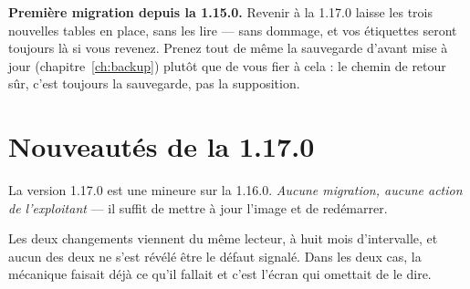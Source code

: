 \begin{warning}
\textbf{Première migration depuis la 1.15.0.} Revenir à la 1.17.0 laisse
les trois nouvelles tables en place, sans les lire \string— sans
dommage, et vos étiquettes seront toujours là si vous revenez. Prenez
tout de même la sauvegarde d'avant mise à jour
(chapitre~\ref{ch:backup}) plutôt que de vous fier à cela : le chemin de
retour sûr, c'est toujours la sauvegarde, pas la supposition.
\end{warning}

\section{Nouveautés de la 1.17.0}\label{sec:whats-new-1.17.0}

La version 1.17.0 est une mineure sur la 1.16.0. \emph{Aucune migration,
aucune action de l'exploitant} \string— il suffit de mettre à jour
l'image et de redémarrer.

Les deux changements viennent du même lecteur, à huit mois d'intervalle,
et aucun des deux ne s'est révélé être le défaut signalé. Dans les deux
cas, la mécanique faisait déjà ce qu'il fallait et c'est l'écran qui
omettait de le dire.

